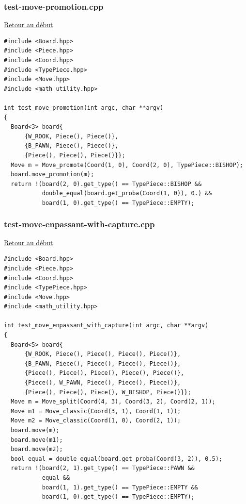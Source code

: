 {\begin{frame}[fragile]
\begin{verbatim}
\end{verbatim}
\end{frame}

\begin{frame}[fragile]
\label{testmovepromotion.cpp}
\frametitle{test-move-promotion.cpp}
\hyperlink{conclusion}{Retour au début}\newline
\begin{verbatim}
#include <Board.hpp>
#include <Piece.hpp>
#include <Coord.hpp>
#include <TypePiece.hpp>
#include <Move.hpp>
#include <math_utility.hpp>

int test_move_promotion(int argc, char **argv)
{
  Board<3> board{
      {W_ROOK, Piece(), Piece()},
      {B_PAWN, Piece(), Piece()},
      {Piece(), Piece(), Piece()}};
  Move m = Move_promote(Coord(1, 0), Coord(2, 0), TypePiece::BISHOP);
  board.move_promotion(m);
  return !(board(2, 0).get_type() == TypePiece::BISHOP &&
           double_equal(board.get_proba(Coord(1, 0)), 0.) &&
           board(1, 0).get_type() == TypePiece::EMPTY);

\end{verbatim}
\end{frame}

\begin{frame}[fragile]
\label{testmoveenpassantwithcapture.cpp}
\frametitle{test-move-enpassant-with-capture.cpp}
\hyperlink{conclusion}{Retour au début}\newline
\begin{verbatim}
#include <Board.hpp>
#include <Piece.hpp>
#include <Coord.hpp>
#include <TypePiece.hpp>
#include <Move.hpp>
#include <math_utility.hpp>

int test_move_enpassant_with_capture(int argc, char **argv)
{
  Board<5> board{
      {W_ROOK, Piece(), Piece(), Piece(), Piece()},
      {B_PAWN, Piece(), Piece(), Piece(), Piece()},
      {Piece(), Piece(), Piece(), Piece(), Piece()},
      {Piece(), W_PAWN, Piece(), Piece(), Piece()},
      {Piece(), Piece(), Piece(), W_BISHOP, Piece()}};
  Move m = Move_split(Coord(4, 3), Coord(3, 2), Coord(2, 1));
  Move m1 = Move_classic(Coord(3, 1), Coord(1, 1));
  Move m2 = Move_classic(Coord(1, 0), Coord(2, 1));
  board.move(m);
  board.move(m1);
  board.move(m2);
  bool equal = double_equal(board.get_proba(Coord(3, 2)), 0.5);
  return !(board(2, 1).get_type() == TypePiece::PAWN &&
           equal &&
           board(1, 1).get_type() == TypePiece::EMPTY &&
           board(1, 0).get_type() == TypePiece::EMPTY);


\end{verbatim}
\end{frame}}
